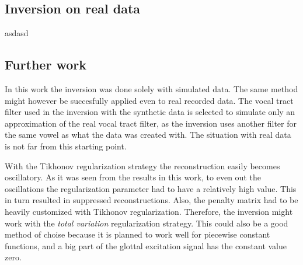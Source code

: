 \documentclass[12pt,a4]{article}
\begin{document}
\subsection{Inversion on real data}

asdasd


\subsection{Further work}

In this work the inversion was done solely with simulated data. The same method might however be succesfully applied even to real recorded data. The vocal tract filter used in the inversion with the synthetic data is selected to simulate only an approximation of the real vocal tract filter, as the inversion uses another filter for the same vowel as what the data was created with. The situation with real data is not far from this starting point.

With the Tikhonov regularization strategy the reconstruction easily becomes oscillatory. As it was seen from the results in this work, to even out the oscillations the regularization parameter had to have a relatively high value. This in turn resulted in suppressed reconstructions. Also, the penalty matrix had to be heavily customized with Tikhonov regularization. Therefore, the inversion might work with the \emph{total variation} regularization strategy.\cite{samu} This could also be a good method of choise because it is planned to work well for piecewise constant functions, and a big part of the glottal excitation signal has the constant value zero.
\end{document}
